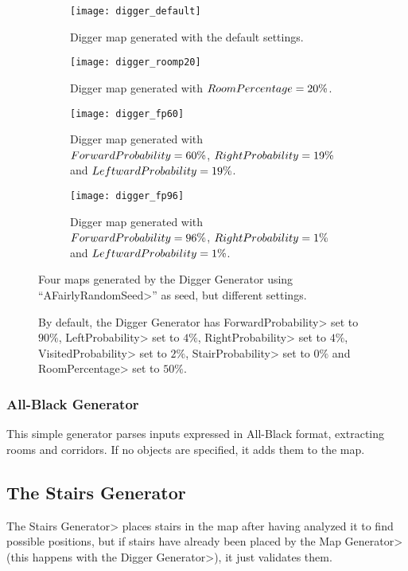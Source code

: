 \begin{figure}[tp]
\centering
\begin{subfigure}[t]{0.48\linewidth}
\texttt{[image: digger\_default]}
\caption{Digger map generated with the default settings.}
\end{subfigure}
\begin{subfigure}[t]{0.48\linewidth}
\texttt{[image: digger\_roomp20]}
\caption{Digger map generated with $Room\-Per\-cent\-age = 20\%$.}
\end{subfigure}
\begin{subfigure}[t]{0.48\linewidth}
\texttt{[image: digger\_fp60]}
\caption{Digger map generated with $For\-ward\-Prob\-a\-bil\-i\-ty = 60\%$, $Right\-Prob\-a\-bil\-i\-ty = 19\%$ and $Left\-ward\-Prob\-a\-bil\-i\-ty = 19\%$.}
\end{subfigure}
\begin{subfigure}[t]{0.48\linewidth}
\texttt{[image: digger\_fp96]}
\caption{Digger map generated with $For\-ward\-Prob\-a\-bil\-i\-ty = 96\%$, $Right\-Prob\-a\-bil\-i\-ty = 1\%$ and $Left\-ward\-Prob\-a\-bil\-i\-ty = 1\%$.}
\end{subfigure}
\caption{Four maps generated by the Digger Generator using ``\<AFairlyRandomSeed>'' as seed, but different settings.}
\caption*{By default, the Digger Generator has \<For\-ward\-Prob\-a\-bil\-i\-ty> set to $90\%$, \<Left\-Prob\-a\-bil\-i\-ty> set to $4\%$, \<Right\-Prob\-a\-bil\-i\-ty> set to $4\%$, \<Vis\-it\-ed\-Prob\-a\-bil\-i\-ty> set to $2\%$, \<Stair\-Prob\-a\-bil\-i\-ty> set to $0\%$ and \<Room\-Per\-cent\-age> set to $50\%$.}
\label{fig:diggers}
\end{figure}


\subsubsection{All-Black Generator}

This simple generator parses inputs expressed in All-Black format, extracting rooms and corridors. If no objects are specified, it adds them to the map.


\subsection{The Stairs Generator}

The \<Stairs Generator> places stairs in the map after having analyzed it to find possible positions, but if stairs have already been placed by the \<Map Generator> (this happens with the \<Digger Generator>), it just validates them.

